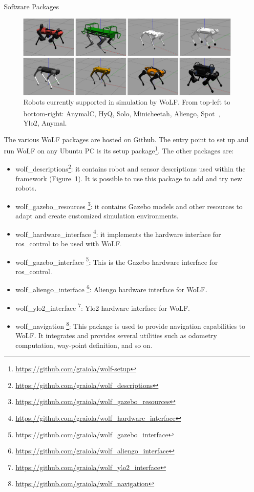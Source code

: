 \begin{myblock}{\large Software Packages}

	\begin{figure}[thb!]
		\centering
		\includegraphics[width=0.8\columnwidth]{images/all_robots.pdf}
		\caption{Robots currently supported in simulation by WoLF. From top-left to bottom-right: AnymalC, HyQ, Solo, Minicheetah, Aliengo, Spot\textsuperscript\textregistered \ , Ylo2, Anymal.}
		\label{fig:robots}
	\end{figure}
	
	The various WoLF packages are hosted on Github. The entry point to set up and run WoLF on any Ubuntu PC is its setup package\footnote{\url{https://github.com/graiola/wolf-setup}}. The other packages are:
	\begin{itemize}
		\item wolf\_descriptions\footnote{\url{https://github.com/graiola/wolf_descriptions}}: it contains robot and sensor descriptions used within the framework (Figure~\ref{fig:robots}). It is possible to use this package to add and try new robots.
		\item wolf\_gazebo\_resources \footnote{\url{https://github.com/graiola/wolf_gazebo_resources}}: it contains Gazebo models and other resources to adapt and create customized simulation environments.
		\item wolf\_hardware\_interface \footnote{\url{https://github.com/graiola/wolf_hardware_interface}}: it implements the hardware interface for ros\_control to be used with WoLF.
		\item wolf\_gazebo\_interface \footnote{\url{https://github.com/graiola/wolf_gazebo_interface}}: This is the Gazebo hardware interface for ros\_control.
		\item wolf\_aliengo\_interface \footnote{\url{https://github.com/graiola/wolf_aliengo_interface}}: Aliengo hardware interface for WoLF. 
		\item wolf\_ylo2\_interface \footnote{\url{https://github.com/graiola/wolf_ylo2_interface}}: Ylo2 hardware interface for WoLF.
		\item wolf\_navigation \footnote{\url{https://github.com/graiola/wolf_navigation}}: This package is used to provide navigation capabilities to WoLF. It integrates and provides several utilities such as odometry computation, way-point definition, and so on.
	\end{itemize}
\end{myblock}	
	
